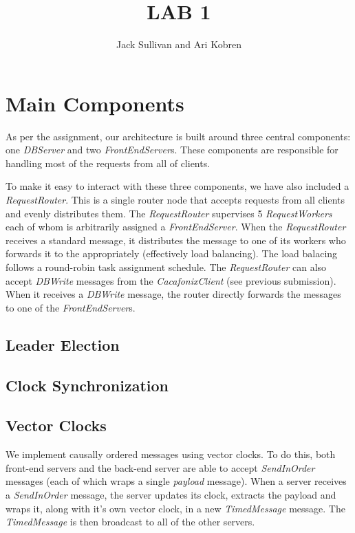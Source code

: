\documentclass[11pt]{article}
\begin{document}
\title{LAB 1}
\author{Jack Sullivan and Ari Kobren}
\maketitle

\section{Main Components}
As per the assignment, our architecture is built around three central
components: one \emph{DBServer} and two \emph{FrontEndServer}s. These
components are responsible for handling most of the requests from all
of clients.

To make it easy to interact with these three components, we have also
included a \emph{RequestRouter}.  This is a single router node that
accepts requests from all clients and evenly distributes them. The
\emph{RequestRouter} supervises 5 \emph{RequestWorkers} each of whom
is arbitrarily assigned a \emph{FrontEndServer}. When the
\emph{RequestRouter} receives a standard message, it distributes the
message to one of its workers who forwards it to the appropriately
(effectively load balancing). The load balacing follows a round-robin
task assignment schedule.  The \emph{RequestRouter} can also accept
\emph{DBWrite} messages from the \emph{CacafonixClient} (see previous
submission).  When it receives a \emph{DBWrite} message, the router
directly forwards the messages to one of the \emph{FrontEndServer}s.

\subsection{Leader Election}
\label{subsec:leader}

\subsection{Clock Synchronization}
\label{subsec:sync}

\subsection{Vector Clocks}
\label{subsec:vector}
We implement causally ordered messages using vector clocks.  To do
this, both front-end servers and the back-end server are able to
accept \emph{SendInOrder} messages (each of which wraps a single
\emph{payload} message).  When a server receives a \emph{SendInOrder}
message, the server updates its clock, extracts the payload and wraps
it, along with it's own vector clock, in a new \emph{TimedMessage}
message.  The \emph{TimedMessage} is then broadcast to all of the
other servers.
\end{document}

